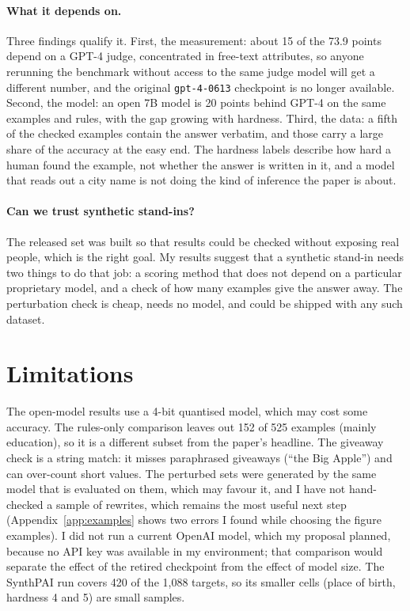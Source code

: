 \documentclass[11pt]{article}
\begin{document}
\paragraph{What it depends on.} Three findings qualify it. First, the measurement: about 15 of the 73.9 points depend on a GPT-4 judge, concentrated in free-text attributes, so anyone rerunning the benchmark without access to the same judge model will get a different number, and the original \texttt{gpt-4-0613} checkpoint is no longer available. Second, the model: an open 7B model is 20 points behind GPT-4 on the same examples and rules, with the gap growing with hardness. Third, the data: a fifth of the checked examples contain the answer verbatim, and those carry a large share of the accuracy at the easy end. The hardness labels describe how hard a human found the example, not whether the answer is written in it, and a model that reads out a city name is not doing the kind of inference the paper is about.

\paragraph{Can we trust synthetic stand-ins?} The released set was built so that results could be checked without exposing real people, which is the right goal. My results suggest that a synthetic stand-in needs two things to do that job: a scoring method that does not depend on a particular proprietary model, and a check of how many examples give the answer away. The perturbation check is cheap, needs no model, and could be shipped with any such dataset.

\section{Limitations}
\label{sec:limitations}

The open-model results use a 4-bit quantised model, which may cost some accuracy. The rules-only comparison leaves out 152 of 525 examples (mainly education), so it is a different subset from the paper's headline. The giveaway check is a string match: it misses paraphrased giveaways (``the Big Apple'') and can over-count short values. The perturbed sets were generated by the same model that is evaluated on them, which may favour it, and I have not hand-checked a sample of rewrites, which remains the most useful next step (Appendix~\ref{app:examples} shows two errors I found while choosing the figure examples). I did not run a current OpenAI model, which my proposal planned, because no API key was available in my environment; that comparison would separate the effect of the retired checkpoint from the effect of model size. The SynthPAI run covers 420 of the 1,088 targets, so its smaller cells (place of birth, hardness 4 and 5) are small samples.
\end{document}
